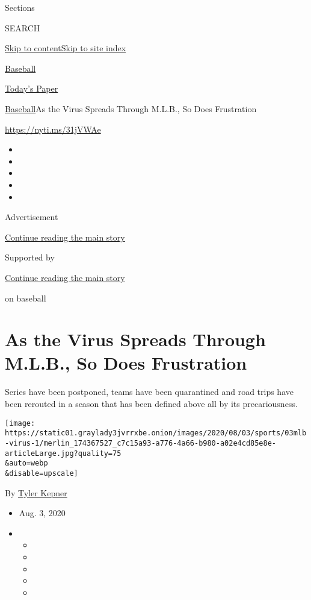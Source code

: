 Sections

SEARCH

\protect\hyperlink{site-content}{Skip to
content}\protect\hyperlink{site-index}{Skip to site index}

\href{https://www.nytimes3xbfgragh.onion/section/sports/baseball}{Baseball}

\href{https://myaccount.nytimes3xbfgragh.onion/auth/login?response_type=cookie\&client_id=vi}{}

\href{https://www.nytimes3xbfgragh.onion/section/todayspaper}{Today's
Paper}

\href{/section/sports/baseball}{Baseball}\textbar{}As the Virus Spreads
Through M.L.B., So Does Frustration

\url{https://nyti.ms/31jVWAe}

\begin{itemize}
\item
\item
\item
\item
\item
\end{itemize}

Advertisement

\protect\hyperlink{after-top}{Continue reading the main story}

Supported by

\protect\hyperlink{after-sponsor}{Continue reading the main story}

on baseball

\hypertarget{as-the-virus-spreads-through-mlb-so-does-frustration}{%
\section{As the Virus Spreads Through M.L.B., So Does
Frustration}\label{as-the-virus-spreads-through-mlb-so-does-frustration}}

Series have been postponed, teams have been quarantined and road trips
have been rerouted in a season that has been defined above all by its
precariousness.

\texttt{[image: https://static01.graylady3jvrrxbe.onion/images/2020/08/03/sports/03mlb-virus-1/merlin\_174367527\_c7c15a93-a776-4a66-b980-a02e4cd85e8e-articleLarge.jpg?quality=75\\\&auto=webp\\\&disable=upscale]}

By \href{https://www.nytimes3xbfgragh.onion/by/tyler-kepner}{Tyler
Kepner}

\begin{itemize}
\item
  Aug. 3, 2020
\item
  \begin{itemize}
  \item
  \item
  \item
  \item
  \item
  \end{itemize}
\end{itemize}

